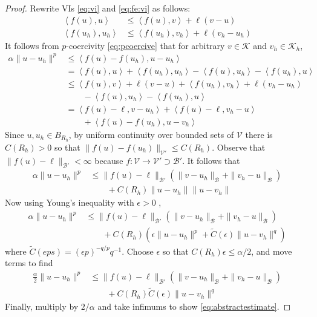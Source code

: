\documentclass[hidelinks,onefignum,onetabnum,final]{siamart220329}  %
\newcommand{\eps}{\epsilon}
\newcommand{\cB}{\mathcal{B}}
\newcommand{\cK}{\mathcal{K}}
\newcommand{\cV}{\mathcal{V}}
\newcommand{\ip}[2]{\left<#1,#2\right>}
\begin{document}
\begin{proof}  Rewrite VIs \eqref{eq:vi} and \eqref{eq:fe:vi} as follows:
\begin{align*}
\ip{f(u)}{u} &\le \ip{f(u)}{v} + \ell(v-u) \\
\ip{f(u_h)}{u_h} &\le \ip{f(u_h)}{v_h} + \ell(v_h-u_h)
\end{align*}
It follows from $p$-coercivity \eqref{eq:pcoercive} that for arbitrary $v\in\cK$ and $v_h\in\cK_h$,
\begin{align*}
\alpha \|u-u_h\|^p &\le \ip{f(u)-f(u_h)}{u-u_h} \\
  &= \ip{f(u)}{u} + \ip{f(u_h)}{u_h} - \ip{f(u)}{u_h} - \ip{f(u_h)}{u} \\
  &\le \ip{f(u)}{v} + \ell(v-u) + \ip{f(u_h)}{v_h} + \ell(v_h-u_h) \\
  &\qquad - \ip{f(u)}{u_h} - \ip{f(u_h)}{u} \\
  &= \ip{f(u)-\ell}{v-u_h} + \ip{f(u)-\ell}{v_h-u} \\
  &\qquad + \ip{f(u)-f(u_h)}{u-v_h}
\end{align*}
Since $u,u_h\in B_{R_h}$, by uniform continuity over bounded sets of $\cV$ there is $C(R_h)>0$ so that $\|f(u)-f(u_h)\|_{\cV'} \le C(R_h)$.  Observe that $\|f(u)-\ell\|_{\cB'} < \infty$ because $f:\cV\to\cV' \supset \cB'$.  It follows that
\begin{align*}
\alpha \|u-u_h\|^p &\le \|f(u)-\ell\|_{\cB'} \left(\|v-u_h\|_{\cB} + \|v_h-u\|_{\cB}\right) \\
  &\qquad + C(R_h) \|u-u_h\| \|u-v_h\|
\end{align*}
Now using Young's inequality with $\eps>0$ \cite[Appendix B.2]{Evans2010},
\begin{align*}
\alpha \|u-u_h\|^p &\le \|f(u)-\ell\|_{\cB'} \left(\|v-u_h\|_{\cB} + \|v_h-u\|_{\cB}\right) \\
  &\qquad + C(R_h) \left(\eps\|u-u_h\|^p + \tilde C(\eps) \|u-v_h\|^q\right)
\end{align*}
where $\tilde C(eps) = (\eps p)^{-q/p} q^{-1}$.  Choose $\eps$ so that $C(R_h) \eps \le \alpha/2$, and move terms to find
\begin{align*}
\frac{\alpha}{2} \|u-u_h\|^p &\le \|f(u)-\ell\|_{\cB'} \left(\|v-u_h\|_{\cB} + \|v_h-u\|_{\cB}\right) \\
  &\qquad + C(R_h) \tilde C(\eps) \|u-v_h\|^q
\end{align*}
Finally, multiply by $2/\alpha$ and take infimums to show \eqref{eq:abstractestimate}.
\end{proof}
\end{document}
